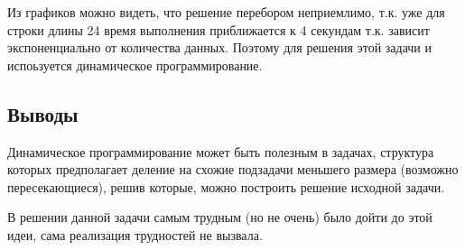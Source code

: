 \documentclass[12pt]{article}
\begin{document}
Из графиков можно видеть, что решение перебором неприемлимо, т.к. уже для строки длины 24 время выполнения приближается к 4 секундам т.к. зависит экспоненциально от количества данных. Поэтому для решения этой задачи и испоьзуется динамическое программирование.

\subsection*{Выводы}

Динамическое программирование может быть полезным в задачах, структура которых предполагает деление на схожие подзадачи меньшего размера (возможно пересекающиеся), решив которые, можно построить решение исходной задачи.

В решении данной задачи самым трудным (но не очень) было дойти до этой идеи, сама реализация трудностей не вызвала. 
\end{document}
